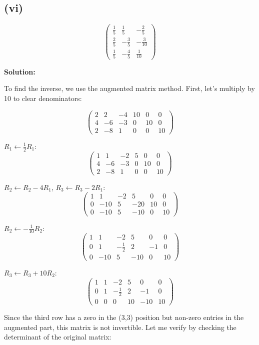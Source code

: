 \subsection*{(vi)}
\[
\begin{pmatrix}
\frac{1}{5} & \frac{1}{5} & -\frac{2}{5}\\
\frac{2}{5} & -\frac{3}{5} & -\frac{3}{10}\\
\frac{1}{5} & -\frac{4}{5} & \frac{1}{10}
\end{pmatrix}
\]

\textbf{Solution:}

To find the inverse, we use the augmented matrix method. First, let's multiply by 10 to clear denominators:

\[
\left(\begin{array}{ccc|ccc}
2 & 2 & -4 & 10 & 0 & 0\\
4 & -6 & -3 & 0 & 10 & 0\\
2 & -8 & 1 & 0 & 0 & 10
\end{array}\right)
\]

$R_1 \leftarrow \frac{1}{2}R_1$:
\[
\left(\begin{array}{ccc|ccc}
1 & 1 & -2 & 5 & 0 & 0\\
4 & -6 & -3 & 0 & 10 & 0\\
2 & -8 & 1 & 0 & 0 & 10
\end{array}\right)
\]

$R_2 \leftarrow R_2 - 4R_1$, $R_3 \leftarrow R_3 - 2R_1$:
\[
\left(\begin{array}{ccc|ccc}
1 & 1 & -2 & 5 & 0 & 0\\
0 & -10 & 5 & -20 & 10 & 0\\
0 & -10 & 5 & -10 & 0 & 10
\end{array}\right)
\]

$R_2 \leftarrow -\frac{1}{10}R_2$:
\[
\left(\begin{array}{ccc|ccc}
1 & 1 & -2 & 5 & 0 & 0\\
0 & 1 & -\frac{1}{2} & 2 & -1 & 0\\
0 & -10 & 5 & -10 & 0 & 10
\end{array}\right)
\]

$R_3 \leftarrow R_3 + 10R_2$:
\[
\left(\begin{array}{ccc|ccc}
1 & 1 & -2 & 5 & 0 & 0\\
0 & 1 & -\frac{1}{2} & 2 & -1 & 0\\
0 & 0 & 0 & 10 & -10 & 10
\end{array}\right)
\]

Since the third row has a zero in the (3,3) position but non-zero entries in the augmented part, this matrix is not invertible. Let me verify by checking the determinant of the original matrix:

